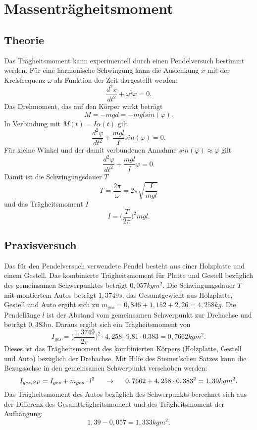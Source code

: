 \section{Massenträgheitsmoment}
\subsection{Theorie}
Das Trägheitsmoment kann experimentell durch einen Pendelversuch bestimmt werden. 
Für eine harmonische Schwingung kann die Auslenkung $x$ mit der Kreisfrequenz $\omega$ als Funktion der Zeit dargestellt werden:
\[ \frac{d^2x}{dt^2}+\omega^2x=0.\]
Das Drehmoment, das auf den Körper wirkt beträgt 
\[M=-mgd = -mglsin(\varphi).\]
In Verbindung mit \(M(t) = I\alpha(t)\) gilt \[ \frac{d^2\varphi}{dt^2}+\frac{mgl}{I}sin(\varphi)=0.\]
Für kleine Winkel und der damit verbundenen Annahme \(sin(\varphi)\approx \varphi\) gilt \[\frac{d^2\varphi}{dt^2}+\frac{mgl}{I} \varphi =0.\]
Damit ist  die Schwingungsdauer $T$  
\[T=\frac{2\pi}{\omega} = 2\pi \sqrt{\frac{I}{mgl}}\] 
und das Trägheitsmoment $I$ 
\[I=\Big(\frac{T}{2\pi}\Big)^2mgl.\]

\subsection{Praxisversuch}
Das für den Pendelversuch verwendete Pendel besteht aus einer Holzplatte und einem Gestell. Das kombinierte Trägheitsmoment für Platte und Gestell bezüglich des gemeinsamen Schwerpunktes beträgt $0,057 kg m^2.$
Die Schwingungsdauer $T$ mit montiertem Autos beträgt $1,3749s$, das Gesamtgewicht aus Holzplatte, Gestell und Auto ergibt sich zu $m_{ges}=0,846+1,152+2,26 = 4,258kg$. Die Pendellänge $l$ ist der Abstand  vom gemeinsamen Schwerpunkt zur Drehachse und beträgt  $0,383m.$   Daraus  ergibt sich ein Trägheitsmoment von 
\[I_{ges} = \Big(\frac{1,3749}{2\pi}\Big)^2 \cdot 4,258 \cdot 9.81 \cdot 0.383 = 0,7662 kg m^2.\]
Dieses ist das Trägheitsmoment  des kombinierten Körpers (Holzplatte, Gestell und Auto) bezüglich der Drehachse. Mit Hilfe des Steiner'schen Satzes kann die Bezugsachse in den gemeinsamen Schwerpunkt verschoben werden: 
\[I_{ges,SP} = I_{ges} + m_{ges} \cdot l^2  \hspace{5mm} \rightarrow  \hspace{5mm} 0,7662 + 4,258 \cdot 0,383^2 = 1,39kgm^2.\] 
Das Trägheitsmoment des Autos bezüglich des Schwerpunkts berechnet sich aus der Differenz des Gesamtträgheitsmoment und des Trägheitsmoment der Aufhängung:
\[1,39-0,057 = 1,333 kgm^2.\]